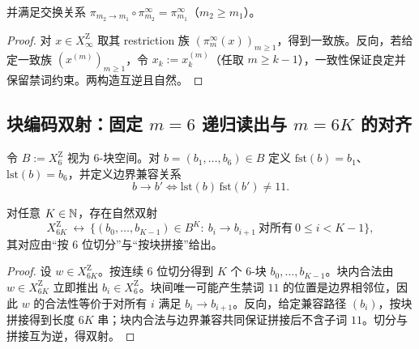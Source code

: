 \begin{theorem}[逆极限同构]
\[\]
并满足交换关系 $\pi_{m_2\to m_1}\circ \pi_{m_2}^\infty=\pi_{m_1}^\infty$（$m_2\ge m_1$）。
\end{theorem}\begin{proof}
对 $x\in X_\infty^{\mathrm Z}$ 取其 restriction 族 $(\pi_m^\infty(x))_{m\ge 1}$，得到一致族。反向，若给定一致族 $(x^{(m)})_{m\ge 1}$，令 $x_k:=x^{(m)}_k$（任取 $m\ge k-1$），一致性保证良定并保留禁词约束。两构造互逆且自然。
\end{proof}\subsection{块编码双射：固定 \texorpdfstring{$m=6$}{m=6} 递归读出与 \texorpdfstring{$m=6K$}{m=6K} 的对齐}令 $B:=X_6^{\mathrm Z}$ 视为 6-块空间。对 $b=(b_1,\dots,b_6)\in B$ 定义 $\mathrm{fst}(b)=b_1$、$\mathrm{lst}(b)=b_6$，并定义边界兼容关系
\[
b\to b'\iff \mathrm{lst}(b)\,\mathrm{fst}(b')\neq 11.
\]\begin{proposition}[块编码双射]\label{prop:app-block-bijection}
对任意 $K\in\mathbb{N}$，存在自然双射
\[
X_{6K}^{\mathrm Z}\ \longleftrightarrow\ \{(b_0,\dots,b_{K-1})\in B^K:\ b_i\to b_{i+1}\ \text{对所有}\ 0\le i<K-1\},
\]
其对应由“按 6 位切分”与“按块拼接”给出。
\end{proposition}\begin{proof}
设 $w\in X_{6K}^{\mathrm Z}$。按连续 6 位切分得到 $K$ 个 6-块 $b_0,\dots,b_{K-1}$。块内合法由 $w\in X_{6K}^{\mathrm Z}$ 立即推出 $b_i\in X_6^{\mathrm Z}$。块间唯一可能产生禁词 $11$ 的位置是边界相邻位，因此 $w$ 的合法性等价于对所有 $i$ 满足 $b_i\to b_{i+1}$。反向，给定兼容路径 $(b_i)$，按块拼接得到长度 $6K$ 串；块内合法与边界兼容共同保证拼接后不含子词 $11$。切分与拼接互为逆，得双射。
\end{proof}